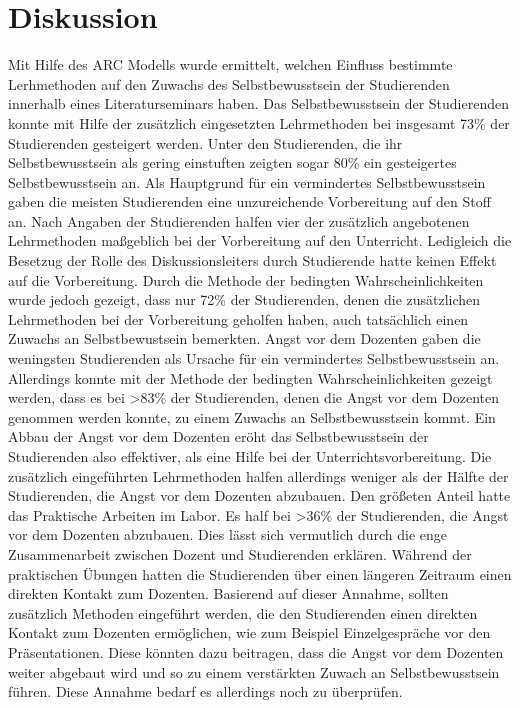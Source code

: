 \section{Diskussion}
Mit Hilfe des ARC Modells wurde ermittelt, welchen Einfluss bestimmte Lerhmethoden auf den Zuwachs des Selbstbewusstsein der Studierenden innerhalb eines Literaturseminars haben. Das Selbstbewusstsein der Studierenden konnte mit Hilfe der zusätzlich eingesetzten Lehrmethoden bei insgesamt 73\% der Studierenden gesteigert werden. Unter den Studierenden, die ihr Selbstbewusstsein als gering einstuften zeigten sogar 80\% ein gesteigertes Selbstbewusstsein an. Als Hauptgrund für ein vermindertes Selbstbewusstsein gaben die meisten Studierenden eine unzureichende Vorbereitung auf den Stoff an. Nach Angaben der Studierenden halfen vier der zusätzlich angebotenen Lehrmethoden maßgeblich bei der Vorbereitung auf den Unterricht. Ledigleich die Besetzug der Rolle des Diskussionsleiters durch Studierende hatte keinen Effekt auf die Vorbereitung. Durch die Methode der bedingten Wahrscheinlichkeiten wurde jedoch gezeigt, dass nur 72\% der Studierenden, denen die zusätzlichen Lehrmethoden bei der Vorbereitung geholfen haben, auch tatsächlich einen Zuwachs an Selbstbewustsein bemerkten. Angst vor dem Dozenten gaben die weningsten Studierenden als Ursache für ein vermindertes Selbstbewusstsein an. Allerdings konnte mit der Methode der bedingten Wahrscheinlichkeiten gezeigt werden, dass es bei >83\% der Studierenden, denen die Angst vor dem Dozenten genommen werden konnte, zu einem Zuwachs an Selbstbewusstsein kommt. Ein Abbau der Angst vor dem Dozenten eröht das Selbstbewusstsein der Studierenden also effektiver, als eine Hilfe bei der Unterrichtsvorbereitung. Die zusätzlich eingeführten Lehrmethoden halfen allerdings weniger als der Hälfte der Studierenden, die Angst vor dem Dozenten abzubauen. Den größeten Anteil hatte das Praktische Arbeiten im Labor. Es half bei >36\% der Studierenden, die Angst vor dem Dozenten abzubauen. Dies lässt sich vermutlich durch die enge Zusammenarbeit zwischen Dozent und Studierenden erklären. Während der praktischen Übungen hatten die Studierenden über einen längeren Zeitraum einen direkten Kontakt zum Dozenten. Basierend auf dieser Annahme, sollten zusätzlich Methoden eingeführt werden, die den Studierenden einen direkten Kontakt zum Dozenten ermöglichen, wie zum Beispiel Einzelgespräche vor den Präsentationen. Diese könnten dazu beitragen, dass die Angst vor dem Dozenten weiter abgebaut wird und so zu einem verstärkten Zuwach an Selbstbewusstsein führen. Diese Annahme bedarf es allerdings noch zu überprüfen.